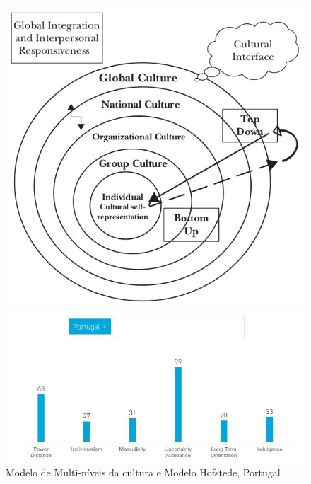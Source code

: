 \begin{figure}[H]
	\begin{minipage}{0.3\linewidth}
		\flushleft
		\includegraphics[scale=0.30]{./image/CORGA/OB/OB_MUltilevelmodelCulture.jpg}
	\end{minipage}
	\hspace{1cm}
	\begin{minipage}{0.4\linewidth}
		\flushleft
		\includegraphics[scale=0.44]{./image/CORGA/OB/Hofstede_pt}
	\end{minipage}
	\caption{Modelo de Multi-níveis da cultura e Modelo Hofstede, Portugal}
\end{figure}
